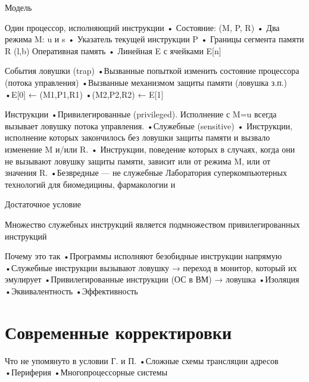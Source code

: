 \documentclass{beamer}
\begin{document}
\begin{frame}{Модель}

Один процессор, исполняющий
инструкции
• Состояние: (M, P, R)
• Два режима M: u и s
• Указатель текущей инструкции P
• Границы сегмента памяти R (l,b)
Оперативная память
• Линейная E с ячейками E[n]

\end{frame}

\begin{frame}{}
События ловушки (trap)
•Вызванные попыткой изменить состояние
процессора (потока управления)
•Вызванные механизмом защиты памяти
(ловушка з.п.)
•E[0] ← (M1,P1,R1)
•(M2,P2,R2) ← E[1]

\end{frame}

\begin{frame}{}
Инструкции
•Привилегированные (privileged). Исполнение с
M=u всегда вызывает ловушку потока
управления.
•Служебные (sensitive)
• Инструкции, исполнение которых
закончилось без ловушки защиты памяти и
вызвало изменение M и/или R.
• Инструкции, поведение которых в случаях,
когда они не вызывают ловушку защиты
памяти, зависит или от режима M, или от
значения R.
•Безвредные — не служебные
Лаборатория суперкомпьютерных технологий для биомедицины, фармакологии и
\end{frame}

\begin{frame}[shrink=20]{Достаточное условие}

Множество служебных инструкций является
подмножеством привилегированных инструкций

\centering
 
\end{frame}

\begin{frame}{}
Почему это так
•Программы исполняют безобидные инструкции напрямую
•Служебные инструкции вызывают ловушку → переход в
монитор, который их эмулирует
•Привилегированные инструкции (ОС в ВМ) → ловушка
•Изоляция
•Эквивалентность
•Эффективность

\end{frame}

\section{Современные корректировки}

\begin{frame}{}
Что не упомянуто в условии Г. и П.
•Сложные схемы трансляции адресов
•Периферия
•Многопроцессорные системы

\end{frame}
\end{document}
